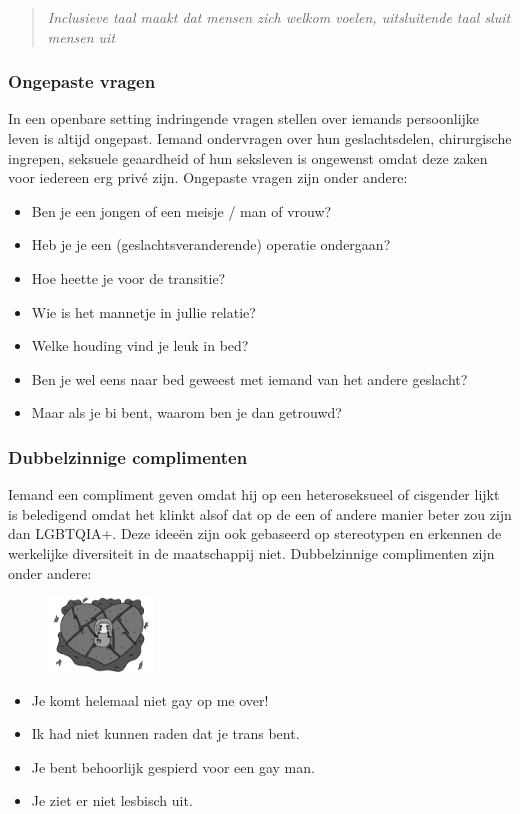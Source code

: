 \documentclass[12pt,openany]{book}
\begin{document}
\begin{quote}
\textit{Inclusieve taal maakt dat mensen zich welkom voelen, uitsluitende taal sluit mensen uit}
\end{quote}

\subsubsection*{Ongepaste vragen}

In een openbare setting indringende vragen stellen over iemands persoonlijke leven is altijd ongepast. Iemand ondervragen over hun geslachtsdelen, chirurgische ingrepen, seksuele geaardheid of hun seksleven is ongewenst omdat deze zaken voor iedereen erg privé zijn. Ongepaste vragen zijn onder andere: 

\begin{itemize}
  \setlength\itemsep{-0.3em}
  \item Ben je een jongen of een meisje / man of vrouw?
  \item Heb je je een (geslachtsveranderende) operatie ondergaan?
  \item Hoe heette je voor de transitie?
  \item Wie is het mannetje in jullie relatie?
  \item Welke houding vind je leuk in bed?
  \item Ben je wel eens naar bed geweest met iemand van het andere geslacht?
  \item Maar als je bi bent, waarom ben je dan getrouwd?
\end{itemize}

\subsubsection*{Dubbelzinnige complimenten}

Iemand een compliment geven omdat hij op een heteroseksueel of cisgender lijkt is beledigend omdat het klinkt alsof dat op de een of andere manier beter zou zijn dan LGBTQIA+. Deze ideeën zijn ook gebaseerd op stereotypen en erkennen de werkelijke diversiteit in de maatschappij niet. Dubbelzinnige complimenten zijn onder andere: 
\begin{figure}
    \centering
    \includegraphics[width=0.25\textwidth]{29bw.png}
\end{figure}
\begin{itemize}
  \setlength\itemsep{-0.3em}
  \item Je komt helemaal niet gay op me over!
  \item Ik had niet kunnen raden dat je trans bent.
  \item Je bent behoorlijk gespierd voor een gay man.
  \item Je ziet er niet lesbisch uit.
\end{itemize}
\end{document}
